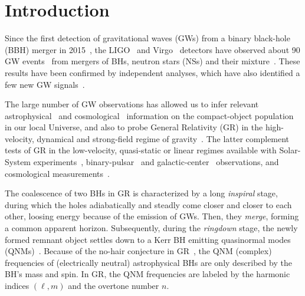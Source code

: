 \documentclass[twocolumn,
               prd,
               aps,
               superscriptaddress,
               tightenlines,
               nofootinbib,
               eqsecnum,
               amsfonts,
               amsmath,
               longbibliography]{revtex4-1}
\begin{document}
\section{Introduction}
\label{sec:intro}

Since the first detection of gravitational waves (GWs) from a binary black-hole (BBH) merger in 2015~\cite{LIGOScientific:2016aoc},
the LIGO~\cite{LIGOScientific:2014pky} and Virgo~\cite{VIRGO:2014yos} detectors have observed about 90 GW events~\cite{LIGOScientific:2021djp} from mergers
of BHs, neutron stars (NSs) \cite{TheLIGOScientific:2017qsa,LIGOScientific:2018cki,LIGOScientific:2020aai} and their mixture~\cite{LIGOScientific:2021qlt}. These results have been confirmed
by independent analyses, which have also identified a few new GW signals~\cite{Nitz:2018imz,Nitz:2019hdf,Venumadhav:2019lyq,Zackay:2019btq,Nitz:2021zwj,Olsen:2022pin}.

The large number of GW observations has allowed us to infer relevant astrophysical~\cite{LIGOScientific:2021aug} and cosmological~\cite{LIGOScientific:2021psn} information on the compact-object population in our local Universe, and also to probe General Relativity (GR) in the high-velocity, dynamical and strong-field regime of gravity~\cite{Yunes:2016jcc,LIGOScientific:2021sio}. The latter complement tests of GR in the low-velocity, quasi-static or linear regimes available with Solar-System experiments~\cite{Will:2014kxa}, binary-pulsar~\cite{Wex:2014nva,Kramer:2021jcw} and galactic-center~\cite{GRAVITY:2018ofz,Do:2019txf,EventHorizonTelescope:2019ths} observations,
and cosmological measurements~\cite{Clifton:2011jh}.

The coalescence of two BHs in GR is characterized by a long \textit{inspiral} stage, during which the
holes adiabatically and steadly come closer and closer to each other, loosing energy because of the emission
of GWs. Then, they \textit{merge}, forming a common apparent horizon. Subsequently, during the \textit{ringdown} stage, the newly formed remnant object settles down to a Kerr BH emitting quasinormal modes (QNMs)~\cite{Vishveshwara:1970cc,Press:1971wr,Chandrasekhar:1975zza}. Because of the no-hair conjecture in GR~\cite{Carter:1971zc,Israel:1967wq,Hawking:1971vc,Robinson:1975bv}, the QNM (complex) frequencies of (electrically neutral) astrophysical BHs are only described by the BH's mass and spin. In GR, the QNM frequencies are labeled by the harmonic indices $(\ell,m)$ and the overtone number $n$.
\end{document}
